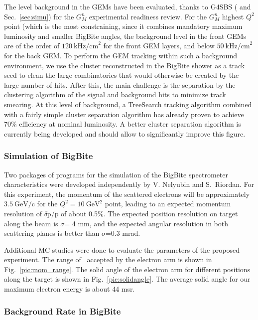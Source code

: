The level background in the GEMs have been evaluated, thanks to G4SBS (\cite{g4sbs} and Sec.~\ref{sec:simu}) for the $G_M^n$ experimental readiness review. %
For the $G_M^n$ highest $Q^2$ point (which is the most constraining, since it combines mandatory maximum luminosity and smaller BigBite angles, the background level in the front GEMs are of the order of $120~\mathrm{kHz/cm}^2$ for the front GEM layers, and below $50~\mathrm{kHz/cm}^2$ for the back GEM.
To perform the GEM tracking within such a background environment, we use the cluster reconstructed in the BigBite shower as a track seed to clean the large combinatorics that would otherwise be created by the large number of hits. After this, the main challenge is the separation by the clustering algorithm of the signal and background hits to minimize track smearing.
At this level of background, a TreeSearch tracking algorithm combined with a fairly simple cluster separation algorithm has already proven to achieve 70\% efficiency at nominal luminosity.
A better cluster separation algorithm is currently being developed and should allow to significantly improve this figure. 

\iffalse
\subsubsection{Simulation of BigBite}

Two packages of programs for the simulation of the BigBite spectrometer characteristics
were developed independently by V. Nelyubin \cite{nel01} and S.~Riordan.  
For this experiment, the momentum of the scattered electrons will be approximately $\mathrm{3.5~\mathrm{GeV/c}}$ for the $Q^2 = 10~\mathrm{GeV}^2$ point, 
leading to an expected momentum resolution of $\delta$p/p  of about 0.5\%.  
The expected position resolution on target
along the beam is $\sigma$= 4 mm, and the expected angular resolution in both 
scattering planes is better than $\sigma$=0.3 mrad.  

Additional MC studies were done to evaluate the parameters of the proposed experiment.  
The range of \qsq~accepted by the electron arm is shown in Fig.~\ref{pic:mom_range}. 
The solid angle of the electron arm for different positions along the target is shown in Fig.~\ref{pic:solidangle}.  
The average solid angle for our maximum electron energy is about 44 msr.
%

\subsubsection{Background Rate in BigBite}

